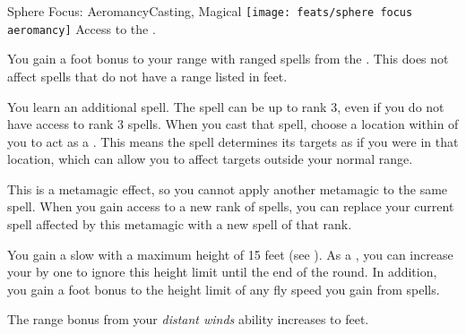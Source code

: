   \begin{magicalfeat}{Sphere Focus: Aeromancy}{Casting, Magical}
    \texttt{[image: feats/sphere focus aeromancy]}
    \featpre Access to the  .

     You gain a  foot bonus to your range with ranged spells from the  .
    This does not affect spells that do not have a range listed in feet.

     You learn an additional spell.
    The spell can be up to rank 3, even if you do not have access to rank 3 spells.
    When you cast that spell, choose a location within \shortrange of you to act as a .
    This means the spell determines its targets as if you were in that location, which can allow you to affect targets outside your normal range.

    This is a metamagic effect, so you cannot apply another metamagic to the same spell.
    When you gain access to a new rank of spells, you can replace your current spell affected by this metamagic with a new spell of that rank.

     You gain a slow  with a maximum height of 15 feet (see ).
    As a , you can increase your  by one to ignore this height limit until the end of the round.
    In addition, you gain a  foot bonus to the height limit of any fly speed you gain from  spells.

     The range bonus from your \textit{distant winds} ability increases to  feet.
  \end{magicalfeat}

